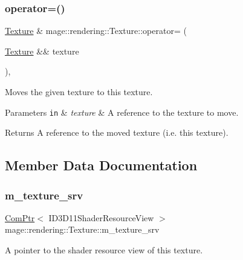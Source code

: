 \subsubsection{\texorpdfstring{operator=()}{operator=()}\hspace{0.1cm}{\footnotesize\ttfamily [2/2]}}
{\footnotesize\ttfamily \hyperlink{classmage_1_1rendering_1_1_texture}{Texture} \& mage\+::rendering\+::\+Texture\+::operator= (\begin{DoxyParamCaption}\item[{\hyperlink{classmage_1_1rendering_1_1_texture}{Texture} \&\&}]{texture }\end{DoxyParamCaption})\hspace{0.3cm}{\ttfamily [default]}, {\ttfamily [noexcept]}}

Moves the given texture to this texture.


\begin{DoxyParams}[1]{Parameters}
\mbox{\tt in}  & {\em texture} & A reference to the texture to move. \\
\hline
\end{DoxyParams}
\begin{DoxyReturn}{Returns}
A reference to the moved texture (i.\+e. this texture). 
\end{DoxyReturn}


\subsection{Member Data Documentation}
\hypertarget{classmage_1_1rendering_1_1_texture_a71312b72f42a9a6a90c0b4555e586308}{}\label{classmage_1_1rendering_1_1_texture_a71312b72f42a9a6a90c0b4555e586308} 
\subsubsection{\texorpdfstring{m\+\_\+texture\+\_\+srv}{m\_texture\_srv}}
{\footnotesize\ttfamily \hyperlink{namespacemage_ae74f374780900893caa5555d1031fd79}{Com\+Ptr}$<$ I\+D3\+D11\+Shader\+Resource\+View $>$ mage\+::rendering\+::\+Texture\+::m\+\_\+texture\+\_\+srv\hspace{0.3cm}{\ttfamily [private]}}

A pointer to the shader resource view of this texture. 